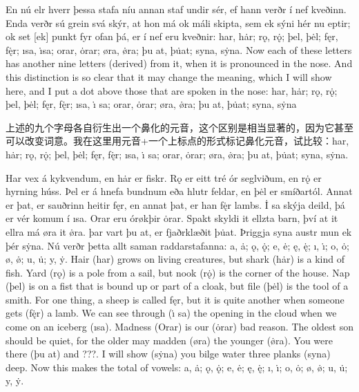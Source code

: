 \begin{paracol}{2}
  En nú elr hverr þessa stafa níu annan staf undir sér, ef hann verðr í nef kveðinn. Enda verðr sú grein svá skýr, at hon má ok máli skipta, sem ek sýni hér nu eptir; ok set [ek] punkt fyr ofan þá, er í nef eru kveðnir: har, hȧr; rǫ, rǫ̇; þel, þėl; fęr, fę̇r; ısa, ı̇sa; orar, ȯrar; øra, ø̇ra; þu at, þu̇at; syna, sẏna.
  \switchcolumn
  Now each of these letters has another nine letters (derived) from it, when it is pronounced in the nose. And this distinction is so clear that it may change the meaning, which I will show here, and I put a dot above those that are spoken in the nose: har, hȧr; rǫ, rǫ̇; þel, þėl; fęr, fę̇r; ısa, ı̇ sa; orar, ȯrar; øra, ø̇ra; þu at, þu̇at; syna, sẏna
\end{paracol}
\begin{translation*}{}
  上述的九个字母各自衍生出一个鼻化的元音，这个区别是相当显著的，因为它甚至可以改变词意。我在这里用元音+一个上标点的形式标记鼻化元音，试比较：har, hȧr; rǫ, rǫ̇; þel, þėl; fęr, fę̇r; ısa, ı̇ sa; orar, ȯrar; øra, ø̇ra; þu at, þu̇at; syna, sẏna.
\end{translation*}

\begin{paracol}{2}
  Har vex á kykvendum, en hȧr er fiskr. Rǫ er eitt tré ór seglviðum, en rǫ̇ er hyrning húss. Þel er á hnefa bundnum eða hlutr feldar, en þėl er smíðartól. Annat er þat, er sauðrinn heitir fęr, en annat þat, er han fę̇r lambs. İ sa skýja deild, þá er vér komum í ısa. Orar eru órøkþir ȯrar. Spakt skyldi it ellzta barn, því at it ellra má øra it ø̇ra. þar vart þu at, er fjaðrklæðit þu̇at\footnotemark. Þriggja syna austr mun ek þér sẏna. Nú verðr þetta allt saman raddarstafanna: a, ȧ; ǫ, ǫ̇; e, ė; ę, ę̇; ı, ı̇; o, ȯ; ø, ø̇; u, u̇; y, ẏ.
  \switchcolumn
  Hair (har) grows on living creatures, but shark (hȧr) is a kind of fish. Yard (rǫ) is a pole from a sail, but nook (rǫ̇) is the corner of the house. Nap (þel) is on a fist that is bound up or part of a cloak, but file (þėl) is the tool of a smith. For one thing, a sheep is called fęr, but it is quite another when someone gets (fę̇r) a lamb. We can see through (ı̇ sa) the opening in the cloud when we come on an iceberg (ısa). Madness (Orar) is our (ȯrar) bad reason. The oldest son should be quiet, for the older may madden (øra) the younger (ø̇ra). You were there (þu at) and ???. I will show (sẏna) you bilge water three planks (syna) deep. Now this makes the total of vowels: a, ȧ; ǫ, ǫ̇; e, ė; ę, ę̇; ı, ı̇; o, ȯ; ø, ø̇; u, u̇; y, ẏ.
\end{paracol}

